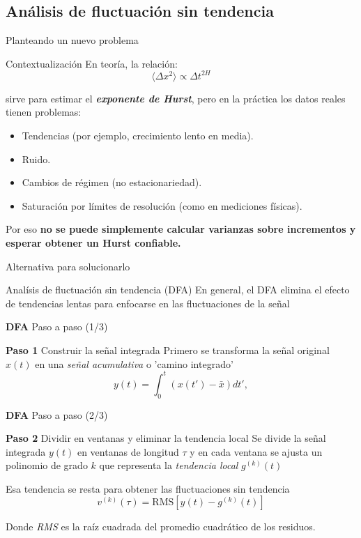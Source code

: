 \documentclass[11pt]{beamer}
\begin{document}
\subsection{Análisis de fluctuación sin tendencia}

\begin{frame}{Planteando un nuevo problema}
\small
\begin{block}{Contextualización}
En teoría, la relación:
$$
\langle \Delta x^2 \rangle \propto \Delta t^{2H}
$$

sirve para estimar el \textbf{\textit{exponente de Hurst}}, pero en la práctica los datos reales tienen problemas:
\begin{itemize}
	\item Tendencias (por ejemplo, crecimiento lento en media).
	\item Ruido.
	\item Cambios de régimen (no estacionariedad).
	\item Saturación por límites de resolución (como en mediciones físicas).
\end{itemize}

Por eso \textbf{no se puede simplemente calcular varianzas sobre incrementos y esperar obtener un Hurst confiable.}
\end{block}
\end{frame}

\begin{frame}{Alternativa para solucionarlo}
\begin{block}{Analísis de fluctuación sin tendencia (DFA)}
 En general, el DFA elimina el efecto de tendencias lentas para enfocarse en las fluctuaciones de la señal
\end{block}
\end{frame}

\begin{frame}{\textbf{DFA} Paso a paso (1/3)}
\begin{block}{\textbf{Paso 1} Construir la señal integrada}
Primero se transforma la señal original $x(t)$ en una \textit{señal acumulativa} o 'camino integrado'
\begin{equation}
y(t) = \int_{0}^{t} (x(t') - \bar{x}) dt',
\end{equation}
\end{block}
\end{frame}

\begin{frame}{\textbf{DFA} Paso a paso (2/3)}
\begin{block}{\textbf{Paso 2} Dividir en ventanas y eliminar la tendencia local}
Se divide la señal integrada $y(t)$ en ventanas de longitud $\tau$ y en cada ventana se ajusta un polinomio de grado $k$ que representa la \textit{tendencia local} $g^{(k)}(t)$

Esa tendencia se resta para obtener las fluctuaciones sin tendencia
\begin{equation}
v^{(k)}(\tau)=\text{RMS}[y(t)-g^{(k)}(t)]
\end{equation}

Donde \textit{RMS} es la raíz cuadrada del promedio cuadrático de los residuos.
\end{block}

\end{frame}
\end{document}
